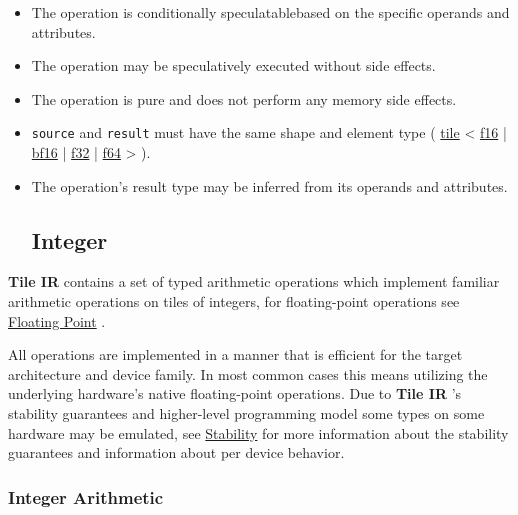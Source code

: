 \documentclass{article}
\begin{document}
\begin{itemize}
\item The operation is conditionally speculatablebased on the specific operands and attributes.
\item The operation may be speculatively executed without side effects.
\item The operation is pure and does not perform any memory side effects.
\item \texttt{source} and \texttt{result} must have the same shape and element type ( \href{https://docs.nvidia.com/cuda/tile-ir/latest/sections/types.html#type-tile}{tile} < \href{https://docs.nvidia.com/cuda/tile-ir/latest/sections/types.html#subsection-element-types}{f16} | \href{https://docs.nvidia.com/cuda/tile-ir/latest/sections/types.html#subsection-element-types}{bf16} | \href{https://docs.nvidia.com/cuda/tile-ir/latest/sections/types.html#subsection-element-types}{f32} | \href{https://docs.nvidia.com/cuda/tile-ir/latest/sections/types.html#subsection-element-types}{f64} > ).
\item The operation's result type may be inferred from its operands and attributes.



\subsection{Integer}

\end{itemize}
\textbf{Tile IR} contains a set of typed arithmetic operations which implement familiar arithmetic operations on tiles of integers, for floating-point operations see \href{https://docs.nvidia.com/cuda/tile-ir/latest/sections/operations.html#op-group-floating-point}{Floating Point} .


All operations are implemented in a manner that is efficient for the target architecture and device family. In most common cases this means utilizing the underlying hardware's native floating-point operations. Due to \textbf{Tile IR} 's stability guarantees and higher-level programming model some types on some hardware may be emulated, see \href{https://docs.nvidia.com/cuda/tile-ir/latest/sections/stability.html#section-stability}{Stability} for more information about the stability guarantees and information about per device behavior.


\subsubsection{Integer Arithmetic}
\end{document}
